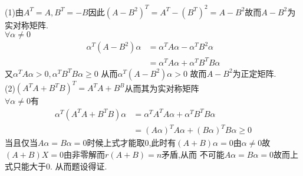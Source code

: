 \documentclass[12pt, a4paper, oneside, UTF8]{ctexbook}
\begin{document}
\begin{enumerate}[label=\arabic*.,start=6]
    \begin{solution}
    (1)由$A^T=A,B^T=-B$因此$(A-B^2)^T=A^T-(B^T)^2=A-B^2$故而$A-B^2$为实对称矩阵. \\
    $\forall \alpha\neq 0$ 
    \begin{align*}
        \alpha^T(A-B^2)\alpha &=\alpha^TA\alpha-\alpha^TB^2\alpha\\
        &=\alpha^TA\alpha+\alpha^TB^TB\alpha 
    \end{align*}
    又$\alpha^TA\alpha>0,\alpha^TB^TB\alpha\geq 0$ 从而$\alpha^T(A-B^2)\alpha>0$ 故而$A-B^2$为正定矩阵. \\
    (2)$(A^TA+B^TB)^T=A^TA+B^B$从而其为实对称矩阵 \\
    $\forall \alpha\neq 0$有
    \begin{align*}
        \alpha^T(A^TA+B^TB)\alpha &= \alpha^TA^TA\alpha + \alpha^TB^TB\alpha \\
        &=(A\alpha)^TA\alpha+(B\alpha)^TB\alpha \geq 0
    \end{align*}
    当且仅当$A\alpha=B\alpha=0$时候上式才能取0,此时有$(A+B)\alpha=0$由$\alpha\neq 0$故$(A+B)X=0$由非零解而$r(A+B)=n$矛盾,从而
    不可能$A\alpha=B\alpha=0$故而上式只能大于0. 从而题设得证.
    \end{solution}
\end{enumerate}

\ifx\allfiles\undefined
\end{document}
